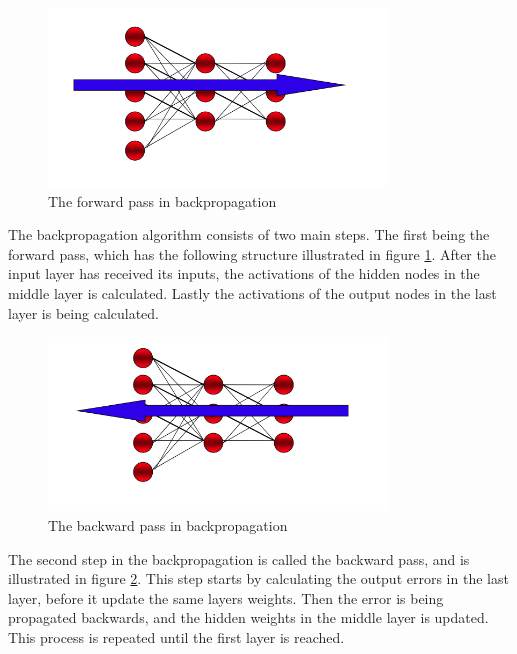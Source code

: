 \documentclass[USenglish]{ifimaster}  %
\begin{document}
\begin{figure}[ht]
    \centering
    \includegraphics[width=0.8\textwidth]{bilder/forward_prop.png}
    \caption{The forward pass in backpropagation \cite{website:inf_4490_mlp}}
    \label{fig:forward_step}
\end{figure}

The backpropagation algorithm consists of two main steps. The first being the forward pass, which has the following structure illustrated in figure \cref{fig:forward_step}. After the input layer has received its inputs, the activations of the hidden nodes in the middle layer is calculated. Lastly the activations of the output nodes in the last layer is being calculated. 

\begin{figure}[ht]
    \centering
    \includegraphics[width=0.8\textwidth]{bilder/backward_prop.png}
    \caption{The backward pass in backpropagation \cite{website:inf_4490_mlp}}
    \label{fig:backward_step}
\end{figure}

The second step in the backpropagation is called the backward pass, and is illustrated in figure \cref{fig:backward_step}. This step starts by calculating the output errors in the last layer, before it update the same layers weights. Then the error is being propagated backwards, and the hidden weights in the middle layer is updated. This process is repeated until the first layer is reached.
\end{document}
